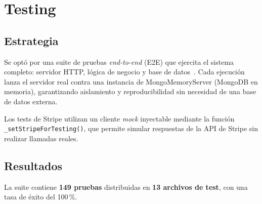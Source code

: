 \chapter{Testing}\label{ch:testing}

\section{Estrategia}

Se optó por una suite de pruebas \emph{end-to-end} (E2E) que ejercita el sistema completo: servidor HTTP, lógica de negocio y base de datos~\cite{jest,supertest}. Cada ejecución lanza el servidor real contra una instancia de MongoMemoryServer (MongoDB en memoria), garantizando aislamiento y reproducibilidad sin necesidad de una base de datos externa.

Los tests de Stripe utilizan un cliente \emph{mock} inyectable mediante la función \texttt{\_setStripeForTesting()}, que permite simular respuestas de la API de Stripe sin realizar llamadas reales.

\section{Resultados}

La suite contiene \textbf{149 pruebas} distribuidas en \textbf{13 archivos de test}, con una tasa de éxito del 100\,\%.

